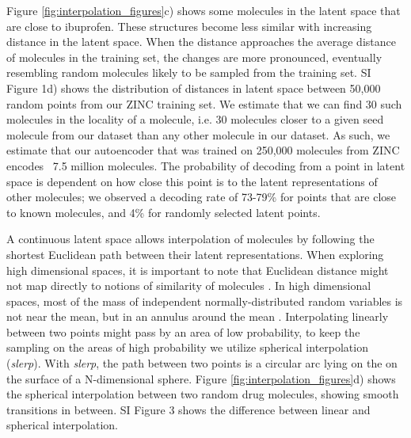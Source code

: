 Figure \ref{fig:interpolation_figures}c) shows some molecules in the latent space that are close to ibuprofen. These structures become less similar with increasing distance in the latent space. When the distance approaches the average distance of molecules in the training set, the changes are more pronounced, eventually resembling random molecules likely to be sampled from the training set. SI Figure 1d) shows the distribution of distances in latent space between 50,000 random points from our ZINC training set. We estimate that we can find 30 such molecules in the locality of a molecule, i.e. 30 molecules closer to a given seed molecule from our dataset than any other molecule in our dataset. As such, we estimate that our autoencoder that was trained on 250,000 molecules from ZINC encodes ~7.5 million molecules. The probability of decoding from a point in latent space is dependent on how close this point is to the latent representations of other molecules; we observed a decoding rate of 73-79\% for points that are close to known molecules, and 4\% for randomly selected latent points.

A continuous latent space allows interpolation of molecules by following the shortest Euclidean path between their latent representations. When exploring high dimensional spaces, it is important to note that Euclidean distance might not map directly to notions of similarity of molecules \cite{Aggarwal2001}. In high dimensional spaces, most of the mass of independent normally-distributed random variables is not near the mean, but in an annulus around the mean \cite{Domingos2012}. Interpolating linearly between two points might pass by an area of low probability, to keep the sampling on the areas of high probability we utilize spherical interpolation\cite{White2016} (\emph{slerp}). With \emph{slerp}, the path between two points is a circular arc lying on the on the surface of a N-dimensional sphere. Figure \ref{fig:interpolation_figures}d) shows the spherical interpolation between two random drug molecules, showing smooth transitions in between. SI Figure 3 shows the difference between linear and spherical interpolation.


